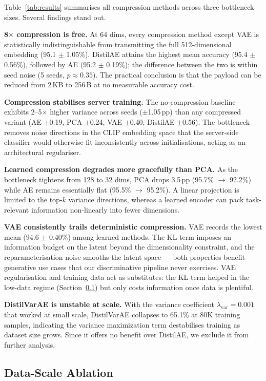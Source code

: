 Table~\ref{tab:results} summarises all compression methods across three bottleneck sizes. Several findings stand out.

\textbf{8$\times$ compression is free.} At 64 dims, every compression method except VAE is statistically indistinguishable from transmitting the full 512-dimensional embedding (95.1 $\pm$ 1.05\%). DistilAE attains the highest mean accuracy (95.4 $\pm$ 0.56\%), followed by AE (95.2 $\pm$ 0.19\%); the difference between the two is within seed noise (5 seeds, $p \approx 0.35$). The practical conclusion is that the payload can be reduced from 2\,KB to 256\,B at no measurable accuracy cost.

\textbf{Compression stabilises server training.} The no-compression baseline exhibits 2--5$\times$ higher variance across seeds ($\pm$1.05\,pp) than any compressed variant (AE $\pm$0.19, PCA $\pm$0.24, VAE $\pm$0.40, DistilAE $\pm$0.56). The bottleneck removes noise directions in the CLIP embedding space that the server-side classifier would otherwise fit inconsistently across initialisations, acting as an architectural regulariser.

\textbf{Learned compression degrades more gracefully than PCA.} As the bottleneck tightens from 128 to 32 dims, PCA drops 3.5\,pp (95.7\% $\to$ 92.2\%) while AE remains essentially flat (95.5\% $\to$ 95.2\%). A linear projection is limited to the top-$k$ variance directions, whereas a learned encoder can pack task-relevant information non-linearly into fewer dimensions.

\textbf{VAE consistently trails deterministic compression.} VAE records the lowest mean (94.6 $\pm$ 0.40\%) among learned methods. The KL term imposes an information budget on the latent beyond the dimensionality constraint, and the reparameterisation noise smooths the latent space — both properties benefit generative use cases that our discriminative pipeline never exercises. VAE regularisation and training data act as substitutes: the KL term helped in the low-data regime (Section~\ref{sec:datascale}) but only costs information once data is plentiful.

\textbf{DistilVarAE is unstable at scale.} With the variance coefficient $\lambda_{\text{var}}=0.001$ that worked at small scale, DistilVarAE collapses to 65.1\% at 80K training samples, indicating the variance maximization term destabilises training as dataset size grows. Since it offers no benefit over DistilAE, we exclude it from further analysis.

\subsection{Data-Scale Ablation}
\label{sec:datascale}

